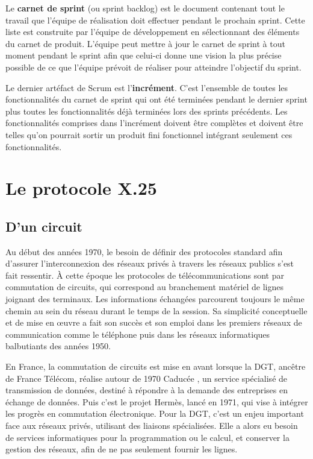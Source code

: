 \documentclass[12pt]{report}
\begin{document}
Le \textbf{carnet de sprint} (ou sprint backlog) est le document contenant tout le travail que l'équipe de réalisation doit effectuer pendant le prochain sprint.
Cette liste est construite par l'équipe de développement en sélectionnant des éléments du carnet de produit. L'équipe peut mettre à jour le carnet de sprint à tout moment pendant le sprint afin que celui-ci donne une vision la plus précise possible de ce que l'équipe prévoit de réaliser pour atteindre l'objectif du sprint.

Le dernier artéfact de Scrum est l'\textbf{incrément}. C'est l'ensemble de toutes les fonctionnalités du carnet de sprint qui ont été terminées pendant le dernier sprint plus toutes les fonctionnalités déjà terminées lors des sprints précédents. Les fonctionnalités comprises dans l'incrément doivent être complètes et doivent être telles qu'on pourrait sortir un produit fini fonctionnel intégrant seulement ces fonctionnalités.

\chapter{Le protocole X.25}

\section{D'un circuit}

Au début des années 1970, le besoin de définir des protocoles standard afin d'assurer l'interconnexion des réseaux privés à travers les réseaux publics s'est fait ressentir.
À cette époque les protocoles de télécommunications sont par commutation de circuits, qui correspond au branchement matériel de lignes joignant des terminaux. Les informations échangées parcourent toujours le même chemin au sein du réseau durant le temps de la session. Sa simplicité conceptuelle et de mise en œuvre a fait son succès et son emploi dans les premiers réseaux de communication comme le téléphone puis dans les réseaux informatiques balbutiants des années 1950\cite{wikicc}.

En France, la commutation de circuits est mise en avant lorsque la \gls{DGT}, ancêtre de France Télécom, réalise autour de 1970 \og Caducée \fg, un service spécialisé de transmission de données, destiné à répondre à la demande des entreprises en échange de données. Puis c'est le projet Hermès, lancé en 1971, qui vise à intégrer les progrès en commutation électronique. Pour la DGT, c'est un enjeu important face aux réseaux privés, utilisant des liaisons spécialisées. Elle a alors eu besoin de services informatiques pour la programmation ou le calcul, et conserver la gestion des réseaux, afin de ne pas seulement fournir les lignes.
\end{document}
